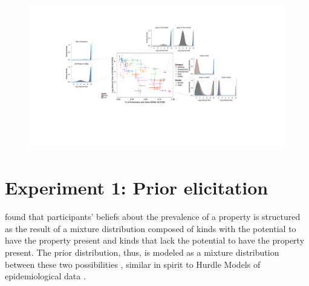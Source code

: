 \documentclass[10pt,letterpaper]{article}
\begin{document}

\begin{figure}[t]
\centering
  \includegraphics[width=\textwidth]{prior-scatter-insets}
  \caption{}
  \label{fig:priorScatter}
\end{figure}
%


\section{Experiment 1: Prior elicitation}

%



 found that participants' beliefs about the prevalence of a property is structured as the result of a mixture distribution composed of kinds with the potential to have the property present and kinds that lack the potential to have the property present.
The prior distribution, thus, is modeled as a mixture distribution between these two possibilities \cite{Griffiths2005}, similar in spirit to Hurdle Models of epidemiological data \cite{hurdleModels}.
\end{document}
